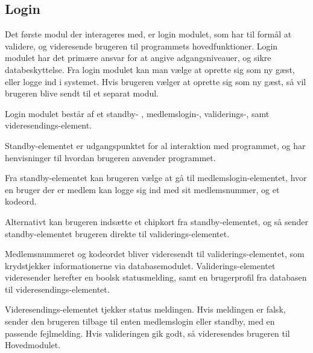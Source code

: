 \subsection{Login}
\label{sub:database}


Det første modul der interageres med, er login modulet, som har til formål at validere, og videresende brugeren til programmets hovedfunktioner. Login modulet har det primære ansvar for at angive adgangsniveauer, og sikre databeskyttelse. Fra login modulet kan man vælge at oprette sig som ny gæst, eller logge ind i systemet. Hvis brugeren vælger at oprette sig som ny gæst, så vil brugeren blive sendt til et separat modul.

Login modulet består af et standby- , medlemslogin-, validerings-, samt videresendings-element.

Standby-elementet er udgangspunktet for al interaktion med programmet, og har henvisninger til hvordan brugeren anvender programmet. 

Fra standby-elementet kan brugeren vælge at gå til medlemslogin-elementet, hvor en bruger der er medlem kan logge sig ind med sit medlemsnummer, og et kodeord.

Alternativt kan brugeren indsætte et chipkort fra standby-elementet, og så sender standby-elementet brugeren direkte til validerings-elementet.

Medlemsnummeret og kodeordet bliver videresendt til validerings-elementet, som krydstjekker informationerne via databasemodulet. Validerings-elementet videresender herefter en boolsk statusmelding, samt en brugerprofil fra databasen til videresendings-elementet.

Videresendings-elementet tjekker status meldingen. Hvis meldingen er falsk, sender den brugeren tilbage til enten medlemslogin eller standby, med en passende fejlmelding. Hvis valideringen gik godt, så videresendes brugeren til Hovedmodulet.